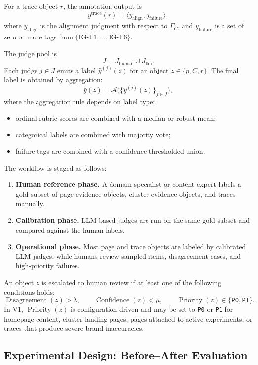 \documentclass{article}
\begin{document}
For a trace object \(r\), the annotation output is
\[
y^{\text{trace}}(r)
=
\langle
y_{\text{align}},
y_{\text{failure}}
\rangle,
\]
where \(y_{\text{align}}\) is the alignment judgment with respect to \(\Gamma_C\), and \(y_{\text{failure}}\) is a set of zero or more tags from \(\{\text{IG-F1},\dots,\text{IG-F6}\}\).

The judge pool is
\[
J = J_{\text{human}} \cup J_{\text{llm}}.
\]
Each judge \(j \in J\) emits a label \(\hat{y}^{(j)}(z)\) for an object \(z \in \{p,C,r\}\). The final label is obtained by aggregation:
\[
\bar{y}(z)=\mathcal{A}\big(\{\hat{y}^{(j)}(z)\}_{j \in J}\big),
\]
where the aggregation rule depends on label type:
\begin{itemize}
    \item ordinal rubric scores are combined with a median or robust mean;
    \item categorical labels are combined with majority vote;
    \item failure tags are combined with a confidence-thresholded union.
\end{itemize}

The workflow is staged as follows:
\begin{enumerate}
    \item \textbf{Human reference phase.} A domain specialist or content expert labels a gold subset of page evidence objects, cluster evidence objects, and traces manually.
    \item \textbf{Calibration phase.} LLM-based judges are run on the same gold subset and compared against the human labels.
    \item \textbf{Operational phase.} Most page and trace objects are labeled by calibrated LLM judges, while humans review sampled items, disagreement cases, and high-priority failures.
\end{enumerate}

An object \(z\) is escalated to human review if at least one of the following conditions holds:
\[
\operatorname{Disagreement}(z) > \lambda,
\qquad
\operatorname{Confidence}(z) < \mu,
\qquad
\operatorname{Priority}(z) \in \{\texttt{P0},\texttt{P1}\}.
\]
In V1, \(\operatorname{Priority}(z)\) is configuration-driven and may be set to \texttt{P0} or \texttt{P1} for homepage content, cluster landing pages, pages attached to active experiments, or traces that produce severe brand inaccuracies.

\subsection{Experimental Design: Before--After Evaluation}
\end{document}
